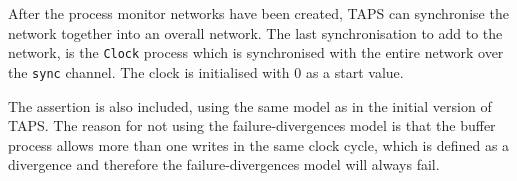After the process monitor networks have been created, TAPS can synchronise the network together into an overall network.
The last synchronisation to add to the network, is the \texttt{Clock} process which is synchronised with the entire network over the \texttt{sync} channel. The clock is initialised with 0 as a start value.

The assertion is also included, using the same model as in the initial version of TAPS. The reason for not using the failure-divergences model is that the buffer process allows more than one writes in the same clock cycle, which is defined as a divergence and therefore the failure-divergences model will always fail.


%



